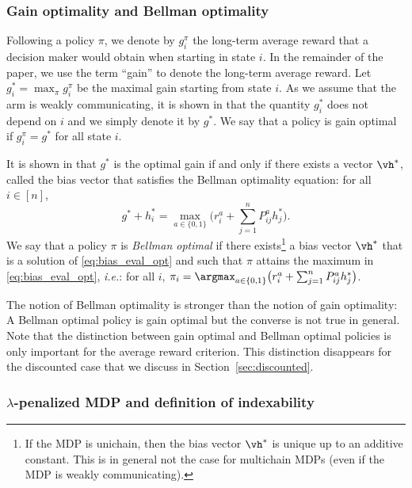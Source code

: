 \subsubsection{Gain optimality and Bellman optimality}
\label{ssec:bellman_optimal}

Following a policy $\pi$, we denote by $g^\pi_i$ the long-term average reward that a decision maker would obtain when starting in state $i$. In the remainder of the paper, we use the term ``gain'' to denote the long-term average reward. Let $g^*_i=\max_\pi g^\pi_i$ be the maximal gain starting from state $i$.  As we assume that the arm is weakly communicating, it is shown in \cite[Chapter 8]{puterman2014markov} that the quantity $g^*_i$ does not depend on $i$ and we simply denote it by $g^*$.  We say that a policy is gain optimal if $g^\pi_i=g^*$ for all state $i$.

It is shown in \cite[Chapter 8]{puterman2014markov} that $g^*$ is the optimal gain if and only if there exists a vector $\vh^*$, called the bias vector that satisfies the Bellman optimality equation:  for all $i\in[n]$,
\begin{equation}
    g^* + h^*_i = \max_{a\in\{0,1\}} \Big( r^{a}_i + \sum_{j=1}^n P^{a}_{ij}h^*_j \Big).  \label{eq:bias_eval_opt}
\end{equation}
We say that a policy  $\pi$ is \emph{Bellman optimal} if there exists\footnote{If the MDP is unichain, then the bias vector $\vh^*$ is unique up to an additive constant.  This is in general not the case for multichain MDPs (even if the MDP is weakly communicating).
} a bias vector $\vh^*$ that is a solution of \eqref{eq:bias_eval_opt} and such that $\pi$ attains the maximum in \eqref{eq:bias_eval_opt}, \emph{i.e.}: for all $i$, ${\pi_i=\argmax_{a\in\{0,1\}} \big(r^{a}_i + \sum_{j=1}^n P^{a}_{ij}h^*_j\big)}$.

The notion of Bellman optimality is stronger than the notion of gain optimality: A Bellman optimal policy is gain optimal but the converse is not true in general. Note that the distinction between gain optimal and Bellman optimal policies is only important for the average reward criterion. This distinction disappears for the discounted case that we discuss in Section~\ref{sec:discounted}.

\subsubsection{\texorpdfstring{$\lambda$-p}{P}enalized MDP and definition of indexability}
\label{sssec:penal_mdp}

